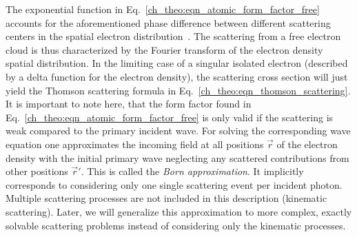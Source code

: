 The exponential function in Eq.~\eqref{ch_theo:eqn_atomic_form_factor_free} accounts for the aforementioned phase difference between different scattering centers in the spatial electron distribution~\cite{daillant_x-ray_2009}. The scattering from a free electron cloud is thus characterized by the Fourier transform of the electron density spatial distribution. In the limiting case of a singular isolated electron (described by a delta function for the electron density), the scattering cross section will just yield the Thomson scattering formula in Eq.~\eqref{ch_theo:eqn_thomson_scattering}. It is important to note here, that the form factor found in Eq.~\eqref{ch_theo:eqn_atomic_form_factor_free} is only valid if the scattering is weak compared to the primary incident wave. For solving the corresponding wave equation one approximates the incoming field at all positions $\vec{r}$ of the electron density with the initial primary wave neglecting any scattered contributions from other positions $\vec{r}'$. This is called the \emph{Born approximation}. It implicitly corresponds to considering only one single scattering event per incident photon. Multiple scattering processes are not included in this description (kinematic scattering). Later, we will generalize this approximation to more complex, exactly solvable scattering problems instead of considering only the kinematic processes.

